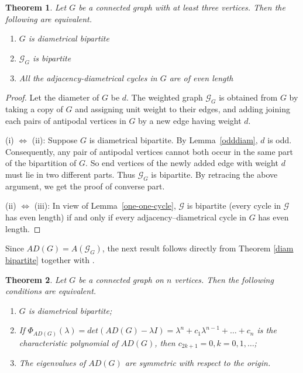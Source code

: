 \documentclass[12pt]{article}
\numberwithin{equation}{section}
\newtheorem{thm}{Theorem}[section]
\begin{document}
	
	
	\begin{thm}\label{thm 5.2}\label{diam bipartite}
		Let $G$ be a connected graph with at least three vertices. Then the following are equivalent.		
		\begin{enumerate}[\normalfont (i)]
			\item $G$ is diametrical bipartite
			\item $\mathcal{G}_G$ is bipartite
			\item All the adjacency-diametrical cycles in $G$ are of even length
		\end{enumerate}  
		
	\end{thm}
	
	\begin{proof}
		
		Let the diameter of $G$ be $d$.	The weighted graph $\mathcal{G}_G$ is obtained from $G$ by taking a copy of $G$ and assigning unit weight to their edges, and adding  joining each pairs of antipodal vertices in $G$ by a new edge having weight $d$. 
		
		(i) $\Leftrightarrow$ (ii): Suppose $G$ is diametrical bipartite. By Lemma~\ref{odddiam}, $d$ is odd.  Consequently, any pair of antipodal vertices cannot both occur in the same part of the bipartition of $G$. So end vertices of the newly added edge with weight $d$ must lie in two different parts. Thus $\mathcal{G}_G$ is bipartite. By retracing the above argument, we get the proof of converse part.
		
		(ii) $\Leftrightarrow$ (iii): In view of Lemma~\ref{one-one-cycle}, 
		$\mathcal G$ is bipartite (every cycle in $\mathcal G$ has even length) if and only if every adjacency–diametrical cycle in $G$ has even length.
	\end{proof}
	
	
	
Since $AD(G) =A(\mathcal{G}_G)$, the next result follows directly from Theorem \ref{diam bipartite} together with \cite[Theorem 3.14]{bapat2010graphs}.
	\begin{thm}\label{thm 5.4}
		Let $G$ be a connected graph on  $n$ vertices. Then the following conditions are equivalent.
		\begin{enumerate}[\normalfont (i)]
			\item $G$ is diametrical bipartite; 
			\item If $ \Phi_{AD(G)}(\lambda)= det(AD(G)-\lambda I)=\lambda^n + c_1\lambda^{n-1}+ \dots +c_n$ is the characteristic polynomial of $AD(G)$, then
			$c_{2k+1} = 0, k = 0,1,\dots$;
			\item The eigenvalues of $AD(G)$ are symmetric with respect to the origin.
		\end{enumerate}
	\end{thm}
	
\end{document}
